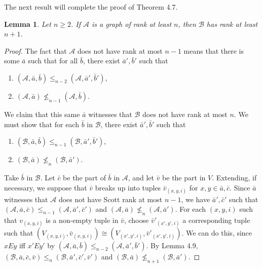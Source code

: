 \documentclass{article}
\newtheorem{lem}[thm]{Lemma}
\begin{document}
The next result will complete the proof of Theorem 4.7.  

\begin{lem}

Let $n\geq 2$.  If $\mathcal{A}$ is a graph of rank at least $n$, then $\mathcal{B}$ has rank at least $n+1$.  

\end{lem}

\begin{proof}

The fact that $\mathcal{A}$ does not have rank at most $n-1$ means that there is some $\bar{a}$ such that for all $\bar{b}$, there exist $\bar{a}',\bar{b}'$ such that 

\begin{enumerate}

\item  $(\mathcal{A},\bar{a},\bar{b})\leq_{n-2}(\mathcal{A},\bar{a}',\bar{b}')$,

\item  $(\mathcal{A},\bar{a})\not\leq_{n-1}(\mathcal{A},\bar{b})$.  

\end{enumerate}
We claim that this same $\bar{a}$ witnesses that $\mathcal{B}$ does not have rank at most $n$.  We must show that for each $\bar{b}$ in $\mathcal{B}$, there exist $\bar{a}',\bar{b}'$ such that 
\begin{enumerate}

\item  $(\mathcal{B},\bar{a},\bar{b})\leq_{n-1}(\mathcal{B},\bar{a}',\bar{b}')$,

\item $(\mathcal{B},\bar{a})\not\leq_n(\mathcal{B},\bar{a}')$.  

\end{enumerate}

Take $\bar{b}$ in $\mathcal{B}$.  Let $\bar{c}$ be the part of $\bar{b}$ in $\mathcal{A}$, and let $\bar{v}$ be the part in $V$.  Extending, if necessary, we suppose that $\bar{v}$ breaks up into tuples $\bar{v}_{(x,y,i)}$ for $x,y\in \bar{a},\bar{c}$.  Since $\bar{a}$ witnesses that $\mathcal{A}$ does not have Scott rank at most $n-1$, we have $\bar{a}',\bar{c}'$ such that 
$(\mathcal{A},\bar{a},\bar{c})\leq_{n-1}(\mathcal{A},\bar{a}',\bar{c}')$ and $(\mathcal{A},\bar{a})\not\leq_n(\mathcal{A},\bar{a}')$.  For each $(x,y,i)$ such that $v_{(x,y,i)}$ is a non-empty tuple in $\bar{v}$, choose $\bar{v}'_{(x',y',i)}$ a corresponding tuple such that $(V_{(x,y,i)},\bar{v}_{(x,y,i)})\cong(V_{(x',y',i)},\bar{v}'_{(x',y',i)})$.  We can do this, since $xEy$ iff $x'Ey'$ by $(\mathcal{A},\bar{a},\bar{b})\leq_{n-2}(\mathcal{A},\bar{a}',\bar{b}')$.  By Lemma 4.9, $(\mathcal{B},\bar{a},\bar{c},\bar{v})\leq_n(\mathcal{B},\bar{a}',\bar{c}',\bar{v}')$ and 
$(\mathcal{B},\bar{a})\not\leq_{n+1}(\mathcal{B},\bar{a}')$.  
\end{proof}  
\end{document}
